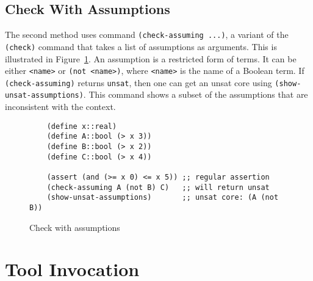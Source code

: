 \documentclass[11pt,twoside,fleqn,openright,titlepage]{cslreport}
\begin{document}
\subsection{Check With Assumptions}

The second method uses command \texttt{(check-assuming ...)}, a
variant of the \texttt{(check)} command that takes a list of
assumptions as arguments.  This is illustrated in
Figure~\ref{example:check-assuming}. An assumption is a restricted
form of terms. It can be either \texttt{<name>} or \texttt{(not
  <name>)}, where \texttt{<name>} is the name of a Boolean term.  If
\texttt{(check-assuming)} returns \texttt{unsat}, then one can get an
unsat core using \texttt{(show-unsat-assumptions)}. This command shows
a subset of the assumptions that are inconsistent with the context.

\begin{figure}[h]
\begin{footnotesize}
\begin{verbatim}
    (define x::real)
    (define A::bool (> x 3))
    (define B::bool (> x 2))
    (define C::bool (> x 4))

    (assert (and (>= x 0) <= x 5)) ;; regular assertion
    (check-assuming A (not B) C)   ;; will return unsat
    (show-unsat-assumptions)       ;; unsat core: (A (not B))
\end{verbatim}
\end{footnotesize}
\caption{Check with assumptions}
\label{example:check-assuming}
\end{figure}





\section{Tool Invocation}
\end{document}
